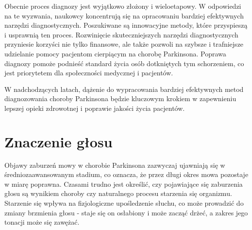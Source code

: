 Obecnie proces diagnozy jest wyjątkowo złożony i wieloetapowy.
W odpowiedzi na te wyzwania, naukowcy koncentrują się na opracowaniu bardziej efektywnych narzędzi diagnostycznych.
Poszukiwane są innowacyjne metody, które przyspieszą i usprawnią ten proces.
Rozwinięcie skuteczniejszych narzędzi diagnostycznych przyniesie korzyści nie tylko finansowe, ale także pozwoli na szybsze i trafniejsze udzielanie pomocy pacjentom cierpiącym na chorobę Parkinsona.
Poprawa diagnozy pomoże podnieść standard życia osób dotkniętych tym schorzeniem, co jest priorytetem dla społeczności medycznej i pacjentów.

W nadchodzących latach, dążenie do wypracowania bardziej efektywnych metod diagnozowania choroby Parkinsona będzie kluczowym krokiem w zapewnieniu lepszej opieki zdrowotnej i poprawie jakości życia pacjentów.


\section{Znaczenie głosu}
\label{sec:znaczenie_glosu}

Objawy zaburzeń mowy w chorobie Parkinsona zazwyczaj ujawniają się w średniozaawansowanym stadium, co oznacza, że przez długi okres mowa pozostaje w miarę poprawna.
Czasami trudno jest określić, czy pojawiające się zaburzenia głosu są wynikiem choroby czy naturalnego procesu starzenia się organizmu.
Starzenie się wpływa na fizjologiczne upośledzenie słuchu, co może prowadzić do zmiany brzmienia głosu - staje się on osłabiony i może zacząć
drżeć, a zakres jego tonacji może się zawężać.


